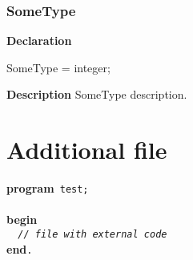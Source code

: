 \documentclass{report}
\newif\ifpdf
\begin{document}
\subsection*{SomeType}
\fi
\label{main-SomeType}
\begin{list}{}{
\setlength{\itemindent}{0cm}
\setlength{\listparindent}{0cm}
\setlength{\leftmargin}{\evensidemargin}
\addtolength{\leftmargin}{\tmplength}
\settowidth{\labelsep}{X}
\addtolength{\leftmargin}{\labelsep}
\setlength{\labelwidth}{\tmplength}
}
\item[\textbf{Declaration}\hfill]
\ifpdf
\begin{flushleft}
\fi
\begin{ttfamily}
SomeType = integer;\end{ttfamily}

\ifpdf
\end{flushleft}
\fi

\par
\item[\textbf{Description}]
SomeType description.

\end{list}
\chapter{Additional file}
\label{somefile}
 

\texttt{}\textbf{program}\texttt{~test;\\\nopagebreak[3]
\\\nopagebreak[3]
}\textbf{begin}\texttt{\\\nopagebreak[3]
~~\textit{//~file~with~external~code}\\\nopagebreak[3]
}\textbf{end}\texttt{.\\
}
\end{document}
